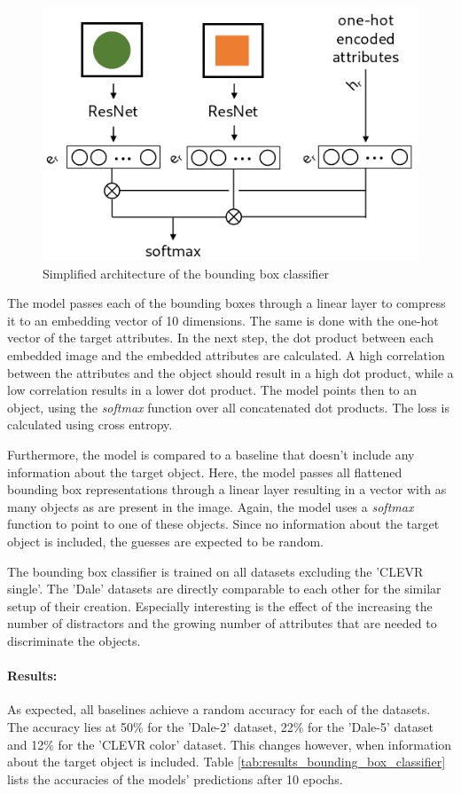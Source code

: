 \begin{figure}[h]
    \centering
    \includegraphics[width=.5\linewidth]{figures/arch_bounding_box_classifier.png}
    \caption{Simplified architecture of the bounding box classifier}
    \label{fig:bounding_box_classifier_architecture}
\end{figure}

The model passes each of the bounding boxes through a linear layer to compress it to an embedding vector of 10 dimensions.
The same is done with the one-hot vector of the target attributes.
In the next step, the dot product between each embedded image and the embedded attributes are calculated.
A high correlation between the attributes and the object should result in a high dot product, while a low correlation results in a lower dot product.
The model points then to an object, using the \emph{softmax} function over all concatenated dot products.
The loss is calculated using cross entropy.

Furthermore, the model is compared to a baseline that doesn't include any information about the target object.
Here, the model passes all flattened bounding box representations through a linear layer resulting in a vector with as many objects as are present in the image.
Again, the model uses a \emph{softmax} function to point to one of these objects.
Since no information about the target object is included, the guesses are expected to be random.

The bounding box classifier is trained on all datasets excluding the 'CLEVR single'.
The 'Dale' datasets are directly comparable to each other for the similar setup of their creation.
Especially interesting is the effect of the increasing the number of distractors and the growing number of attributes that are needed to discriminate the objects.

\paragraph*{Results:}
As expected, all baselines achieve a random accuracy for each of the datasets.
The accuracy lies at 50\% for the 'Dale-2' dataset, 22\% for the 'Dale-5' dataset and 12\% for the 'CLEVR color' dataset.
This changes however, when information about the target object is included.
Table \ref{tab:results_bounding_box_classifier} lists the accuracies of the models' predictions after 10 epochs.

